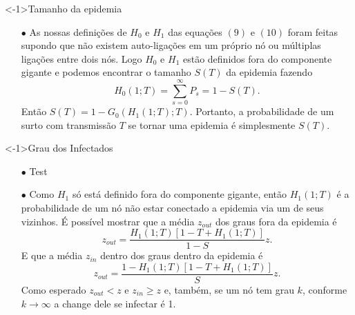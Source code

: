 \documentclass{beamer}
\begin{document}


\begin{frame}

\begin{exampleblock}
    <-1>{Tamanho da epidemia}
    \begin{itemize}
        \item[$\bullet$] As nossas definições de $H_0$ e $H_1$ das equações $(9)$ e $(10)$ 
            foram feitas supondo que não existem auto-ligações em um próprio nó ou múltiplas 
            ligações entre dois nós. Logo $H_0$ e $H_1$ estão definidos fora do componente gigante
            e podemos encontrar o tamanho $S(T)$ da epidemia fazendo
            \begin{equation}
                H_0 (1; T) = \sum_{s=0} ^\infty P_s = 1 - S(T).
            \end{equation}
            Então $S(T) = 1 - G_0 ( H_1 (1; T); T) $. Portanto, a probabilidade de um surto 
            com transmissão $T$ se tornar uma epidemia é simplesmente $S(T)$.
    \end{itemize}
    
\end{exampleblock}

\end{frame}





\begin{frame}
\begin{exampleblock} <-1>{Grau dos Infectados}
    \begin{itemize}
        \item[$\bullet$] Test


        \item[$\bullet$] Como $H_1$ só está definido fora do componente gigante, então $H_1 (1; T)$ é a 
            probabilidade de um nó não estar conectado a epidemia via um de seus vizinhos. É possível 
            mostrar que a média $z_{out}$ dos graus fora da epidemia é 
            \begin{equation}
                z_{out} = \frac{ H_1 (1; T)[1 - T + H_1 (1; T)]} {1 - S} z.
            \end{equation}
            E que a média $z_{in}$ dentro dos graus dentro da epidemia é 
            \begin{equation}
                z_{out} = \frac{ 1 - H_1 (1; T)[1 - T + H_1 (1; T)]} {S} z.
            \end{equation}
            Como esperado $z_{out} < z$ e $z_{in} \geq z$ e, também, se um nó tem grau $k$, 
            conforme $k \to \infty$ a change dele se infectar é 1.
    \end{itemize}
    
\end{exampleblock}

\end{frame}
\end{document}

